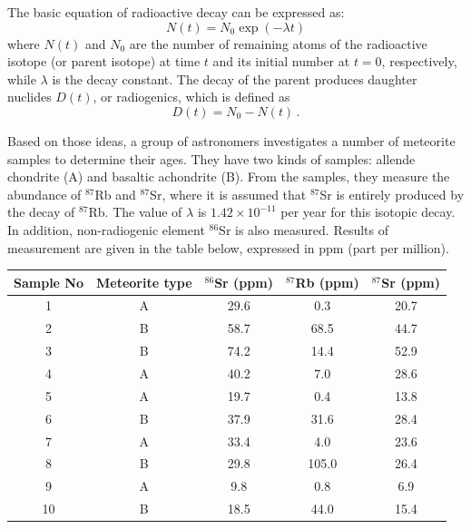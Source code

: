 The basic equation of radioactive decay can be expressed as:
\[ N(t) = N_0 \exp(-\lambda t) \]
where $N(t)$ and $N_0$ are the number of remaining atoms of the radioactive
isotope (or parent isotope) at time $t$ and its initial number at $t = 0$,
respectively, while $\lambda$ is the decay constant. The decay of the parent
produces daughter nuclides $D(t)$, or radiogenics, which is defined as
\[ D(t) = N_0 - N(t)\,. \]

Based on those ideas, a group of astronomers investigates a number of
meteorite samples to determine their ages. They have two kinds of samples:
allende chondrite (A) and basaltic achondrite (B). From the samples, they
measure the abundance of $^{87}$Rb and $^{87}$Sr, where it is assumed that
$^{87}$Sr is entirely produced by the decay of $^{87}$Rb. The value of
$\lambda$ is $1.42 \times 10^{-11}$ per year for this isotopic decay. In
addition, non-radiogenic element $^{86}$Sr is also measured. Results of
measurement are given in the table below, expressed in ppm (part per
million).

\begin{center}
\begin{tabular}{c|c|c|c|c}
Sample No & Meteorite type & $^{86}$Sr (ppm) & $^{87}$Rb (ppm)
  & $^{87}$Sr (ppm) \\
\hline
1  & A & 29.6 & 0.3   & 20.7 \\
2  & B & 58.7 & 68.5  & 44.7 \\
3  & B & 74.2 & 14.4  & 52.9 \\
4  & A & 40.2 & 7.0   & 28.6 \\
5  & A & 19.7 & 0.4   & 13.8 \\
6  & B & 37.9 & 31.6  & 28.4 \\
7  & A & 33.4 & 4.0   & 23.6 \\
8  & B & 29.8 & 105.0 & 26.4 \\
9  & A & 9.8  & 0.8   & 6.9  \\
10 & B & 18.5 & 44.0  & 15.4 \\
\end{tabular}
\end{center}

